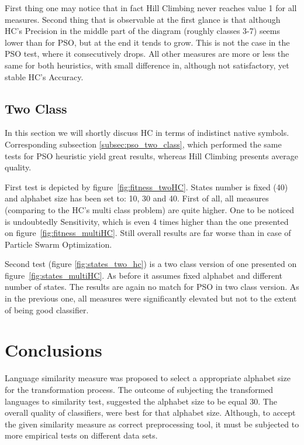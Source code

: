 \documentclass{mini}
\begin{document}
First thing one may notice that in fact Hill Climbing never reaches value 1 for all measures. Second thing that is observable at the first glance is that although HC's Precision in the middle part of the diagram (roughly classes 3-7) seems lower than for PSO, but at the end it tends to grow. This is not the case in the PSO test, where it consecutively drops. All other measures are more or less the same for both heuristics, with small difference in, although not satisfactory, yet stable HC's Accuracy.

\makeFigureHCClasses


\subsection{Two Class} \label{subsec:two_class_hc}
In this section we will shortly discuss HC in terms of indistinct native symbols. Corresponding subsection \ref{subsec:pso_two_class}, which performed the same tests for PSO heuristic yield great results, whereas Hill Climbing presents average quality.

First test is depicted by figure~\ref{fig:fitness_twoHC}. States number is fixed (40) and alphabet size has been set to: 10, 30 and 40. First of all, all measures (comparing to the HC's multi class problem) are quite higher. One to be noticed is undoubtedly Sensitivity, which is even 4 times higher than the one presented on figure~\ref{fig:fitness_multiHC}. Still overall results are far worse than in case of Particle Swarm Optimization.

\makeFigureIndistinctHC

Second test (figure \ref{fig:states_two_hc}) is a two class version of one presented on figure~\ref{fig:states_multiHC}. As before it assumes fixed alphabet and different number of states. The results are again no match for PSO in two class version. As in the previous one, all measures were significantly elevated but not to the extent of being good classifier.
\makeFigureStatesTwoHC

\section{Conclusions}

Language similarity measure was proposed to select a appropriate alphabet size for the transformation process. The outcome of subjecting the transformed languages to similarity test, suggested the alphabet size to be equal $30$. The overall quality of classifiers, were best for that alphabet size. Although, to accept the given similarity measure as correct preprocessing tool, it must be subjected to more empirical tests on different data sets.
\end{document}
